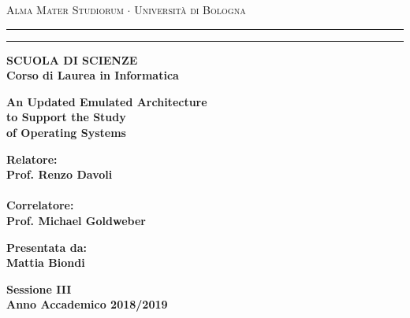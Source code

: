 \documentclass[12pt,a4paper,openright,twoside]{report}
\begin{document}
\begin{titlepage}
\begin{center}
{{\Large{\textsc{Alma Mater Studiorum $\cdot$ Università di
Bologna}}}} \rule[0.1cm]{15.8cm}{0.1mm}
\rule[0.5cm]{15.8cm}{0.6mm}
{\small{\bf SCUOLA DI SCIENZE\\
Corso di Laurea in Informatica }}
\end{center}
\vspace{15mm}
\begin{center}
{\LARGE{\bf An Updated Emulated Architecture}}\\
\vspace{3mm}
{\LARGE{\bf to Support the Study}}\\
\vspace{3mm}
{\LARGE{\bf of Operating Systems}}\\
\end{center}
\vspace{40mm}
\par
\noindent
\begin{minipage}[t]{0.47\textwidth}
{\large{\bf Relatore:\\
Prof. Renzo Davoli\\\\
Correlatore:\\
Prof. Michael Goldweber}}
\end{minipage}
\hfill
\begin{minipage}[t]{0.47\textwidth}\raggedleft
{\large{\bf Presentata da:\\
Mattia Biondi}}
\end{minipage}
\vspace{20mm}
\begin{center}
{\large{\bf Sessione III\\
Anno Accademico 2018/2019}}
\end{center}
\end{titlepage}
\end{document}

